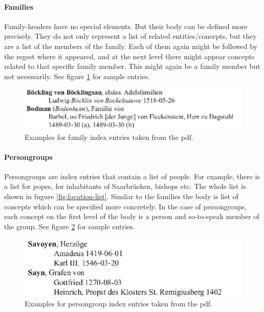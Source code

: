 \paragraph{Families}
Family-headers have no special elements. But their body can be defined more precisely. They do not only represent a list of related entities/concepts, but they are a list of the members of the family. Each of them again might be followed by the regest where it appeared, and at the next level there might appear concepts related to that specific family member. This might again be a family member but not necessarily.
See figure \ref{fig:family-example} for sample entries.

\begin{figure}[h]
  \centering
  \includegraphics[scale=0.45]{img/family-example}
  \caption{Examples for family index entries taken from the pdf.}
  \label{fig:family-example}
\end{figure}

\paragraph{Persongroups}
Persongroups are index entries that contain a list of people. For example, there is a list for popes, for inhabitants of Saarbrücken, bishops etc. The whole list is shown in fugure \ref{fig:location-list}. 
Similar to the families the body is list of concepts which can be specified more concretely. In the case of persongroups, each concept on the first level of the body is a person and so-to-speak member of the group. See figure \ref{fig:persongroup-example} for sample entries.

\begin{figure}[h]
  \centering
  \includegraphics[scale=0.45]{img/persongroup-example}
  \caption{Examples for persongroup index entries taken from the pdf.}
  \label{fig:persongroup-example}
\end{figure}

